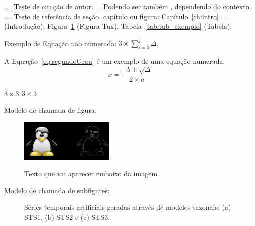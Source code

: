 .....Teste de citaç\~ao de autor: ~\cite{AikesJunior2011}. Podendo ser também , dependendo do contexto.
.....Teste de referência de seç\~ao, cap\'itulo ou figura: Capítulo~\ref{ch:intro} = (Introduç\~ao), Figura~\ref{fig:tux_laplace} (Figura Tux), Tabela~\ref{tab:tab_exemplo} (Tabela).

Exemplo de Equação não numerada: $3 \times \sum_{i=0}^{j}\Delta$.

A Equação~\ref{eq:segundoGrau} é um exemplo de uma equação numerada:
\begin{equation}
x = \dfrac{-b \pm \sqrt{ \Delta}}{2 \times a}
\label{eq:segundoGrau}
\end{equation}


$3 \times 3$
$\boldmath{ 3 \times 3}$

Modelo de chamada de figura.

\begin{figure}[htb]
	\centering
	\includegraphics[width=0.4\textwidth]{Imagens/tux_laplace.png} %
	\caption[Texto que vai aparecer na lista de fig.]{Texto que vai aparecer embaixo da imagem.}
	\label{fig:tux_laplace}
\end{figure}

Modelo de chamada de subfigures:
\begin{figure}[!htb]
\centering
{}
\caption[Séries temporais artificiais geradas através de modelos sazonais]{Séries temporais artificiais geradas através de modelos sazonais: (a) STS1, (b) STS2 e (c) STS3.}
\label{fig:SeriesA}
\end{figure}


